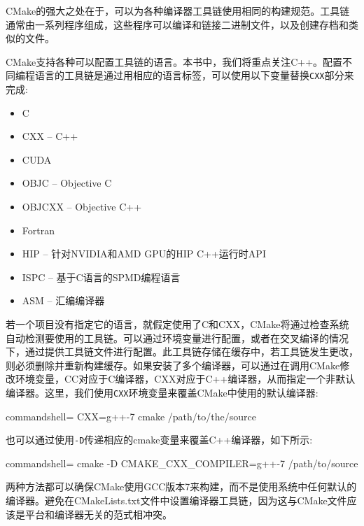 CMake的强大之处在于，可以为各种编译器工具链使用相同的构建规范。工具链通常由一系列程序组成，这些程序可以编译和链接二进制文件，以及创建存档和类似的文件。

CMake支持各种可以配置工具链的语言。本书中，我们将重点关注C++。配置不同编程语言的工具链是通过用相应的语言标签，可以使用以下变量替换\texttt{CXX}部分来完成:

\begin{itemize}
\item 
C

\item 
CXX – C++

\item 
CUDA

\item 
OBJC – Objective C

\item 
OBJCXX – Objective C++

\item 
Fortran

\item 
HIP – 针对NVIDIA和AMD GPU的HIP C++运行时API

\item 
ISPC – 基于C语言的SPMD编程语言

\item 
ASM – 汇编编译器
\end{itemize}

若一个项目没有指定它的语言，就假定使用了C和CXX，CMake将通过检查系统自动检测要使用的工具链。可以通过环境变量进行配置，或者在交叉编译的情况下，通过提供工具链文件进行配置。此工具链存储在缓存中，若工具链发生更改，则必须删除并重新构建缓存。如果安装了多个编译器，可以通过在调用CMake修改环境变量，CC对应于C编译器，CXX对应于C++编译器，从而指定一个非默认编译器。这里，我们使用\texttt{CXX}环境变量来覆盖CMake中使用的默认编译器:

\begin{tcblisting}{commandshell={}}
CXX=g++-7 cmake /path/to/the/source
\end{tcblisting}

也可以通过使用\texttt{-D}传递相应的cmake变量来覆盖C++编译器，如下所示:

\begin{tcblisting}{commandshell={}}
cmake -D CMAKE_CXX_COMPILER=g++-7 /path/to/source
\end{tcblisting}

两种方法都可以确保CMake使用GCC版本7来构建，而不是使用系统中任何默认的编译器。避免在CMakeLists.txt文件中设置编译器工具链，因为这与CMake文件应该是平台和编译器无关的范式相冲突。

